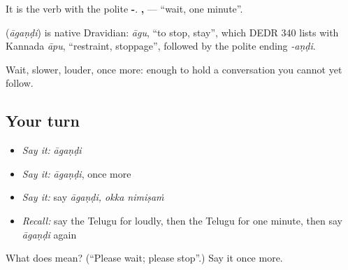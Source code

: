 It is the verb \textbf{} with the polite \textbf{-}. \textbf{,  } — \textquotedblleft{}wait, one minute\textquotedblright{}.

\begin{cousinweb}
\textbf{} (\emph{āgaṇḍi}) is native Dravidian: \emph{āgu}, \textquotedblleft{}to stop, stay\textquotedblright{}, which DEDR 340 lists with Kannada \emph{āpu}, \textquotedblleft{}restraint, stoppage\textquotedblright{}, followed by the polite ending \emph{-aṇḍi}.
\end{cousinweb}

\begin{grammarlens}[title={What you've built}]
Wait, slower, louder, once more: enough to hold a conversation you cannot yet follow.
\end{grammarlens}

\subsection*{Your turn}
\begin{itemize}
\raggedright
  \item \emph{Say it:} \emph{āgaṇḍi}
  \item \emph{Say it:} \emph{āgaṇḍi}, once more
  \item \emph{Say it:} say \emph{āgaṇḍi, okka nimiṣaṁ}
  \item \emph{Recall:} say the Telugu for loudly, then the Telugu for one minute, then say \emph{āgaṇḍi} again
\end{itemize}

\begin{tcolorbox}[breakable,colback=teal!4,colframe=teal!35!black,title={Before you move on}]
What does  mean? (\textquotedblleft{}Please wait; please stop\textquotedblright{}.) Say it once more.
\end{tcolorbox}
